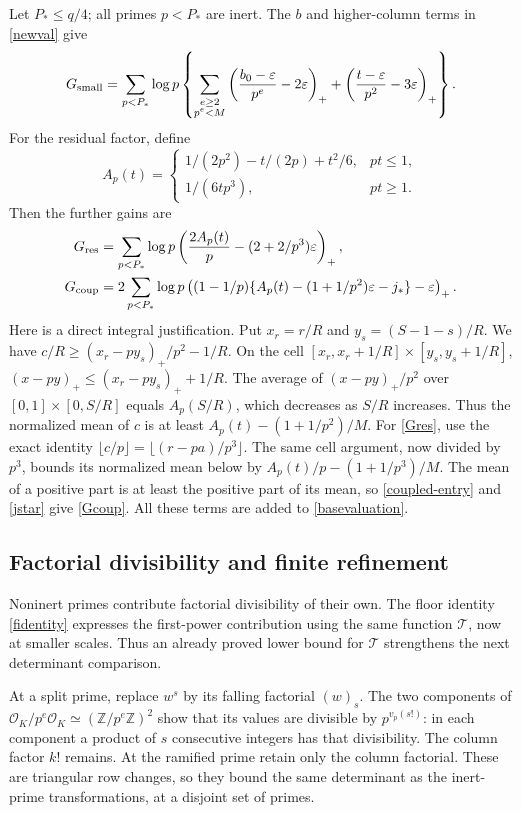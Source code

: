 \documentclass[11pt]{article}
\newcommand{\Z}{\mathbb Z}
\newcommand{\OK}{\mathcal O_K}
\newcommand{\Tn}{\mathcal T}
\begin{document}
Let \(P_*\le q/4\); all primes \(p<P_*\) are inert.
The \(b\) and higher-column terms in \eqref{newval} give
\begin{equation}\label{Gsmall}
 G_{\rm small}=\sum_{p<P_*}\log p\left\{
 \sum_{\substack{e\ge2\\p^e<M}}
       \left(\frac{b_0-\varepsilon}{p^e}-2\varepsilon\right)_+
 +\left(\frac{t-\varepsilon}{p^2}-3\varepsilon\right)_+
 \right\}.
\end{equation}
For the residual factor, define
\[
 A_p(t)=
 \begin{cases}
  1/(2p^2)-t/(2p)+t^2/6,&pt\le1,\\
  1/(6tp^3),&pt\ge1.
 \end{cases}
\]
Then the further gains are
\begin{align}
 G_{\rm res}&=\sum_{p<P_*}\log p
       \left(\frac{2A_p(t)}p-(2+2/p^3)\varepsilon\right)_+,
       \label{Gres}\\
 G_{\rm coup}&=2\sum_{p<P_*}\log p
       \left((1-1/p)\{A_p(t)-(1+1/p^2)\varepsilon-j_*\}
                         -\varepsilon\right)_+.
       \label{Gcoup}
\end{align}
Here is a direct integral justification. Put \(x_r=r/R\) and
\(y_s=(S-1-s)/R\). We have
\(c/R\ge (x_r-py_s)_+/p^2-1/R\).
On the cell \([x_r,x_r+1/R]\times[y_s,y_s+1/R]\),
\((x-py)_+\le(x_r-py_s)_++1/R\).
The average of \((x-py)_+/p^2\) over
\([0,1]\times[0,S/R]\) equals \(A_p(S/R)\), which decreases
as \(S/R\) increases. Thus the normalized mean of
\(c\) is at least \(A_p(t)-(1+1/p^2)/M\).
For \eqref{Gres}, use the exact identity
\(\lfloor c/p\rfloor=\lfloor(r-pa)/p^3\rfloor\).
The same cell argument, now divided by \(p^3\), bounds its
normalized mean below by \(A_p(t)/p-(1+1/p^3)/M\).
The mean of a positive part is at least the positive
part of its mean, so \eqref{coupled-entry} and \eqref{jstar} give
\eqref{Gcoup}. All these terms are added to \eqref{basevaluation}.

\subsection{Factorial divisibility and finite refinement}\label{factorials}
Noninert primes contribute factorial divisibility of their own. The
floor identity \eqref{fidentity} expresses the first-power contribution
using the same function \(\Tn\), now at smaller scales. Thus an already
proved lower bound for \(\Tn\) strengthens the next determinant comparison.

At a split prime, replace \(w^s\) by its falling factorial \((w)_s\).
The two components of
\(\OK/p^e\OK\simeq(\Z/p^e\Z)^2\) show that its values are
divisible by \(p^{v_p(s!)}\): in each component a product of \(s\)
consecutive integers has that divisibility. The column factor \(k!\)
remains. At the ramified prime retain only the column factorial.
These are triangular row changes, so they bound the same determinant
as the inert-prime transformations, at a disjoint set of primes.
\end{document}
